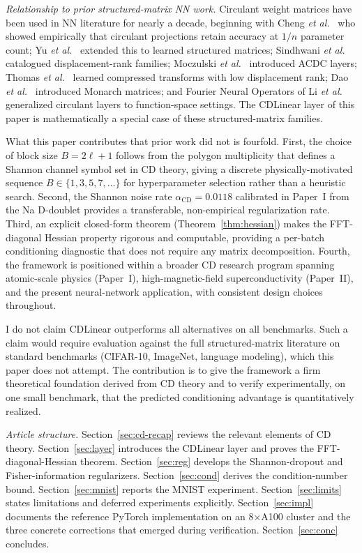 \documentclass[aps,prx,onecolumn,11pt,nofootinbib,longbibliography]{revtex4-2}
\newcommand{\alphaCD}{\alpha_{\mathrm{CD}}}
\begin{document}
\textit{Relationship to prior structured-matrix NN work.}  Circulant weight
matrices have been used in NN literature for nearly a decade, beginning with
Cheng \textit{et al.}~\cite{Cheng2015} who showed empirically that circulant
projections retain accuracy at $1/n$ parameter count; Yu
\textit{et al.}~\cite{Yu2017} extended this to learned structured matrices;
Sindhwani \textit{et al.}~\cite{Sindhwani2015} catalogued displacement-rank
families; Moczulski \textit{et al.}~\cite{Moczulski2016} introduced ACDC layers;
Thomas \textit{et al.}~\cite{Thomas2018} learned compressed transforms with
low displacement rank; Dao \textit{et al.}~\cite{Dao2022} introduced Monarch
matrices; and Fourier Neural Operators of Li
\textit{et al.}~\cite{Li2020} generalized circulant layers to function-space
settings.  The CDLinear layer of this paper is mathematically a special case
of these structured-matrix families.

What this paper contributes that prior work did not is fourfold.  First, the
choice of block size $B = 2\ell + 1$ follows from the polygon multiplicity
that defines a Shannon channel symbol set in CD theory, giving a discrete
physically-motivated sequence $B \in \{1, 3, 5, 7, \ldots\}$ for hyperparameter
selection rather than a heuristic search.  Second, the Shannon noise rate
$\alphaCD = 0.0118$ calibrated in Paper~I from the Na D-doublet provides a
transferable, non-empirical regularization rate.  Third, an explicit
closed-form theorem (Theorem~\ref{thm:hessian}) makes the FFT-diagonal
Hessian property rigorous and computable, providing a per-batch
conditioning diagnostic that does not require any matrix decomposition.
Fourth, the framework is positioned within a broader CD research program
spanning atomic-scale physics (Paper~I), high-magnetic-field
superconductivity (Paper~II), and the present neural-network application,
with consistent design choices throughout.

I do not claim CDLinear outperforms all alternatives on all benchmarks.  Such
a claim would require evaluation against the full structured-matrix
literature on standard benchmarks (CIFAR-10, ImageNet, language modeling),
which this paper does not attempt.  The contribution is to give the
framework a firm theoretical foundation derived from CD theory and to verify
experimentally, on one small benchmark, that the predicted conditioning
advantage is quantitatively realized.

\textit{Article structure.}  Section~\ref{sec:cd-recap} reviews the relevant
elements of CD theory.  Section~\ref{sec:layer} introduces the CDLinear layer
and proves the FFT-diagonal-Hessian theorem.  Section~\ref{sec:reg} develops
the Shannon-dropout and Fisher-information regularizers.
Section~\ref{sec:cond} derives the condition-number bound.
Section~\ref{sec:mnist} reports the MNIST experiment.
Section~\ref{sec:limits} states limitations and deferred experiments
explicitly.  Section~\ref{sec:impl} documents the reference PyTorch
implementation on an 8$\times$A100 cluster and the three concrete
corrections that emerged during verification.
Section~\ref{sec:conc} concludes.
\end{document}

